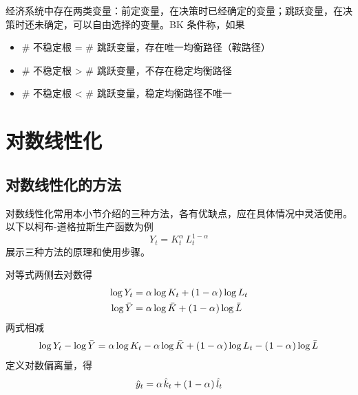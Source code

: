 \myskip
{}

经济系统中存在两类变量：前定变量，在决策时已经确定的变量；跳跃变量，在决策时还未确定，可以自由选择的变量。BK 条件称，如果
\begin{itemize}
    \item \# 不稳定根 = \# 跳跃变量，存在唯一均衡路径（鞍路径）
    \item \# 不稳定根 > \# 跳跃变量，不存在稳定均衡路径
    \item \# 不稳定根 < \# 跳跃变量，稳定均衡路径不唯一
\end{itemize}



\newpage
\section{对数线性化}

\subsection{对数线性化的方法}

对数线性化常用本小节介绍的三种方法，各有优缺点，应在具体情况中灵活使用。以下以柯布-道格拉斯生产函数为例
\begin{equation*}
    Y_t=K_t^\alpha\,L_t^{1-\alpha}
\end{equation*}
展示三种方法的原理和使用步骤。

\myskip
{}

对等式两侧去对数得
\begin{align*}
    \operatorname{log} Y_t & = \alpha\operatorname{log} K_t + \left(\mspace{1mu}1-\alpha\mspace{1mu}\right)\operatorname{log} L_t\\ 
    \operatorname{log} \bar Y & = \alpha\operatorname{log} \bar K + \left(\mspace{1mu}1-\alpha\mspace{1mu}\right)\operatorname{log} \bar L\label{eq:CDProdLog}
\end{align*}
两式相减
\begin{equation*}
    \operatorname{log} Y_t - \operatorname{log} \bar Y = \alpha\operatorname{log} K_t - \alpha\operatorname{log} \bar K + \left(\mspace{1mu}1-\alpha\mspace{1mu}\right)\operatorname{log} L_t - \left(\mspace{1mu}1-\alpha\mspace{1mu}\right)\operatorname{log} \bar L
\end{equation*}
定义对数偏离量，得
\begin{equation*}
    \hat y_t = \alpha\,\hat k_t + \bka{1-\alpha}\hat l_t\label{eq:CDProdLogLinear}
\end{equation*}

\myskip
{}

